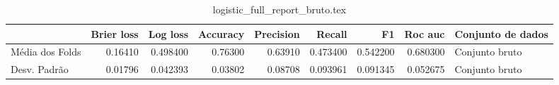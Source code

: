 \begin{table}
\centering
\caption{logistic_full_report_bruto.tex}
\label{logistic_full_report_bruto.tex}
\begin{tabular}{lrrrrrrrl}
\toprule
{}              &  Brier  loss &  Log loss &  Accuracy  &  Precision  &   Recall  &       F1  &  Roc auc  & Conjunto de dados \\
\midrule
Média dos Folds &      0.16410 &  0.498400 &    0.76300 &     0.63910 &  0.473400 &  0.542200 &  0.680300 &    Conjunto bruto \\
Desv. Padrão    &      0.01796 &  0.042393 &    0.03802 &     0.08708 &  0.093961 &  0.091345 &  0.052675 &    Conjunto bruto \\
\bottomrule
\end{tabular}
\end{table}
